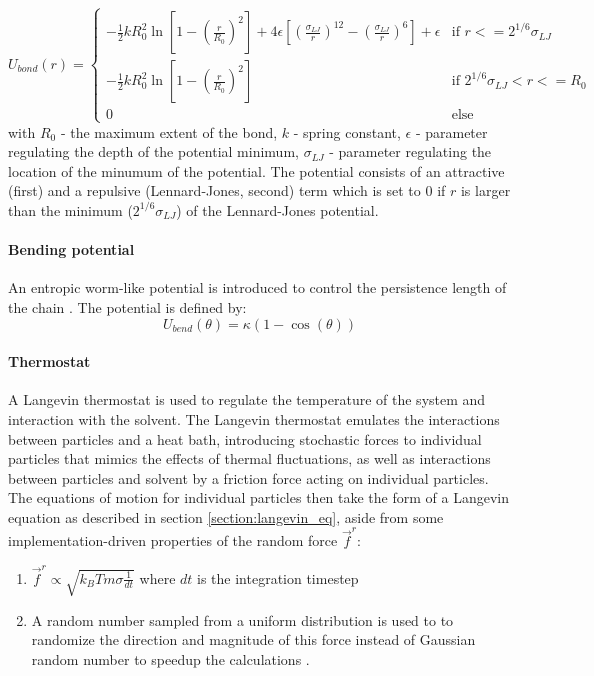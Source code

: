 \documentclass[
    paper=A4,pagesize=automedia,fontsize=12pt,
    BCOR=15mm,DIV=22,
    twoside,headinclude,footinclude=false,
    fleqn,             %
    bibliography=totocnumbered,          %
    listof=totoc,                %
    listof=flat,                 %
    cleardoublepage=empty      %
    numbers=endperiod
]{scrartcl}
\begin{document}
\begin{equation} \label{eq:bond_potential}
    U_{bond}(r) = 
    \begin{cases}
        -\frac{1}{2} k R_0^2 \ln\left[1 - \left(\frac{r}{R_0}\right)^2\right] + 4 \epsilon \left[\left(\frac{\sigma_{LJ}}{r}\right)^{12} - \left(\frac{\sigma_{LJ}}{r}\right)^6\right] + \epsilon & \text{if } r <= 2^{1/6} \sigma_{LJ} \\
        -\frac{1}{2} k R_0^2 \ln\left[1 - \left(\frac{r}{R_0}\right)^2\right] & \text{if } 2^{1/6}\sigma_{LJ} < r <= R_0\\
        0 & \text{else}
    \end{cases}
\end{equation}
with $R_0$ - the maximum extent of the bond, $k$ - spring constant, $\epsilon$ - parameter regulating
the depth of the potential minimum, $\sigma_{LJ}$ - parameter regulating the location of the minumum
of the potential. The potential consists of an attractive (first) and 
a repulsive (Lennard-Jones, second) term which is 
set to $0$ if $r$ is larger than
the minimum ($2^{1/6}\sigma_{LJ}$) of the Lennard-Jones potential.

\paragraph{Bending potential}
\label{par:bend_potential}
An entropic worm-like potential \cite{svaneborg_2020} is introduced to control the persistence length of the chain \cite{svaneborg_2020}.
The potential is defined by:
\begin{equation} \label{eq:angle_potential}
    U_{bend}(\theta) = \kappa (1 - \cos(\theta))
\end{equation}

\paragraph{Thermostat}
A Langevin thermostat is used to regulate the temperature of the system and interaction with the solvent.
The Langevin thermostat emulates the interactions between particles and a heat bath, 
introducing stochastic forces to individual particles that mimics the effects of thermal fluctuations,
as well as interactions between particles and solvent by a friction force acting on individual particles.
The equations of motion for individual particles then take the form of a Langevin equation as described
in section \ref{section:langevin_eq}, aside from some implementation-driven properties of the random force $\vec{f}^r$:
\begin{enumerate}
    \item $\vec{f}^r \propto \sqrt{k_B T m \sigma \frac{1}{dt}}$ where $dt$ is the integration timestep \cite{LAMMPS}
    \item A random number sampled from a uniform distribution is used to to randomize the direction 
    and magnitude of this force instead of Gaussian random number to speedup the
    calculations \cite{LAMMPS} \cite{dunweg}.
\end{enumerate}
\end{document}
